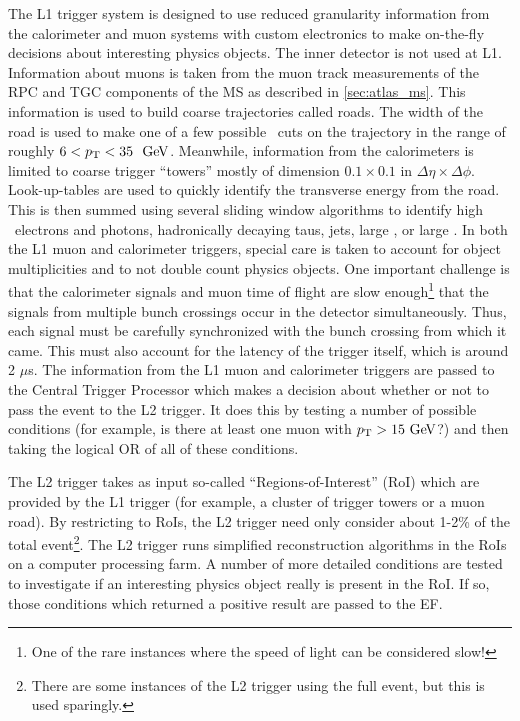 The L1 trigger system is designed to use reduced granularity information
from the calorimeter and muon systems with custom electronics
to make on-the-fly decisions about interesting physics objects.
The inner detector is not used at L1.
Information about muons is taken from the muon track measurements of 
the RPC and TGC components of the MS
as described in \sec\ref{sec:atlas_ms}. This information is 
used to build coarse trajectories called roads. The width of the road
is used to make one of a few possible \pt~cuts on the 
trajectory in the range of roughly $6<\pt<35~\GeV$. 
Meanwhile, information from the 
calorimeters is limited to coarse trigger ``towers'' mostly of dimension
$0.1 \times 0.1$ in $\Delta\eta \times \Delta\phi$.
Look-up-tables are used to quickly identify the transverse energy 
from the road.
This is then summed using several sliding window algorithms to identify 
high \pt~electrons and photons, hadronically decaying taus, jets, large \met,
or large \et. 
In both the L1 muon and calorimeter triggers, special care is taken
to account for object multiplicities and to not double count physics objects. 
One important challenge is that the 
calorimeter signals and muon time of flight are slow enough\footnote{One
of the rare instances where the speed of light can be considered slow!}
that the signals from multiple bunch crossings occur in the detector
simultaneously.  Thus, each signal must be carefully synchronized with 
the bunch crossing from which it came.  
This must also account for the latency of the trigger itself, which
is around 2 $\mu$s.  The information
from the L1 muon and calorimeter triggers are passed to the Central
Trigger Processor which makes a decision about whether or not to pass
the event to the L2 trigger.  It does this by testing 
a number of possible conditions (for example, is there at least one
muon with $\pt > 15 \GeV$?) and then taking the logical OR of all of
these conditions.

The L2 trigger takes as input so-called ``Regions-of-Interest'' (RoI)
which are provided by the L1 trigger (for example, a cluster of 
trigger towers or a muon road). By restricting to RoIs,
the L2 trigger need only consider about 1-2\% of the 
total event\footnote{There are some instances of the L2 trigger
using the full event, but this is used sparingly.}. 
The L2 trigger runs simplified reconstruction algorithms in the RoIs 
on a computer processing farm. 
A number of  more detailed conditions are tested
to investigate 
if an interesting physics object really is present in the RoI.
If so, those conditions which returned a positive result are 
passed to the EF.

